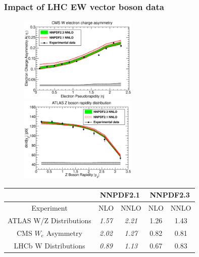 \documentclass[10pt]{beamer}
\begin{document}
\begin{frame}
\frametitle{Impact of LHC EW vector boson data}
 \begin{figure}[b!]
    \begin{center}
      \includegraphics[width=0.50\textwidth]{CMSWEASY840PB_0.eps}
      \includegraphics[width=0.50\textwidth]{ATLASWZRAP36PB_2.eps}
    \end{center}
    \vskip-0.5cm
    \label{fig:pdf-jets}
\end{figure}

\begin{table}
\small
\begin{tabular}{|c||c|c||c|c|}
\hline 
& \multicolumn{2}{c||}{\bf NNPDF2.1} & \multicolumn{2}{|c|}{\bf NNPDF2.3}  \\
\hline 
\hline 
Experiment  & NLO & NNLO  & NLO  & NNLO  \\
\hline
ATLAS W/Z Distributions & {\it 1.57} & {\it 2.21}  & 1.26  &  1.43   \\
CMS $W_e$ Asymmetry  & {\it 2.02} & {\it 1.27}  & 0.82 & 0.81   \\
LHCb W Distributions & {\it 0.89} &  {\it 1.13} & 0.67  & 0.83   \\
\hline
\end{tabular}
\end{table}


\end{frame}
\end{document}
